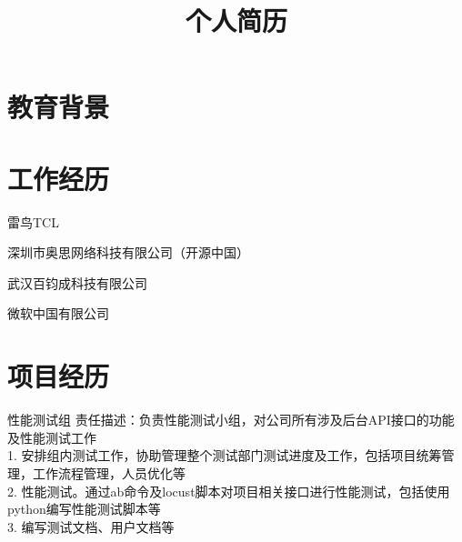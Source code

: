 \documentclass[11pt,a4paper]{moderncv}
\title{个人简历}                      %
\begin{document}
\maketitle

\section{教育背景}



\section{工作经历}
\renewcommand{\baselinestretch}{1.2}

{雷鸟}{TCL}{}{}{}

{深圳市奥思网络科技有限公司（开源中国）}{}{}{}{}

{武汉百钧成科技有限公司}{}{}{}{}

{微软中国有限公司}{}{}{}{}

\section{项目经历}

{性能测试组}{}{}{}
{责任描述：负责性能测试小组，对公司所有涉及后台API接口的功能及性能测试工作\\
1. 安排组内测试工作，协助管理整个测试部门测试进度及工作，包括项目统筹管理，工作流程管理，人员优化等\\
2. 性能测试。通过ab命令及locust脚本对项目相关接口进行性能测试，包括使用python编写性能测试脚本等\\
3. 编写测试文档、用户文档等\\
}
\end{document}

